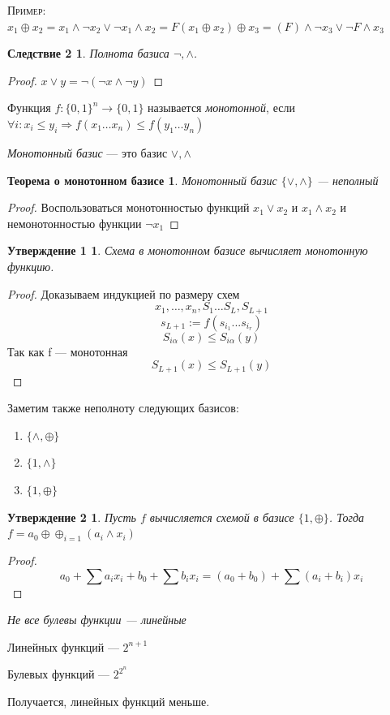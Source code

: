 \documentclass[a4paper, 12pt]{article}
\newtheorem*{sl2}{Следствие 2}
\newtheorem*{monotonousbase}{Теорема о монотонном базисе}
\newtheorem*{scheme}{Утверждение 1}
\newtheorem*{n2}{Утверждение 2}
\begin{document}
\textsc{Пример: }
$x_1 \oplus x_2 = x_1 \wedge \lnot x_2 \vee \lnot x_1 \wedge x_2 = F
(x_1 \oplus x_2) \oplus x_3 = (F)  \wedge \lnot x_3 \vee \lnot F \wedge x_3$

\begin{sl2}
Полнота базиса {$\lnot, \wedge$}.
\end{sl2}
\begin{proof}
$x \vee y = \lnot (\lnot x \wedge \lnot y)$
\end{proof}
Функция $f:\{0, 1\}^n \rightarrow \{0, 1\}$ называется \textit{монотонной}, если $\forall i: x_i \leqslant y_i \Rightarrow f(x_1 \ldots x_n) \leqslant f(y_1 \ldots y_n)$

\textit{Монотонный базис} --- это базис {$\vee, \wedge$}

\begin{monotonousbase}
Монотонный базис $\{\vee, \wedge\}$ --- неполный
\end{monotonousbase}
\begin{proof}
Воспользоваться монотонностью функций $x_1 \vee x_2$ и $x_1 \wedge x_2$ и немонотонностью функции $\lnot x_1$
\end{proof}
\begin{scheme}
Схема в монотонном базисе вычисляет монотонную функцию.
\end{scheme}
\begin{proof}
Доказываем индукцией по размеру схем
\[x_1, \ldots, x_n, S_1 \ldots S_L, S_{L+1}\] 
\[s_{L+1}:=f(s_{i_1}... s_{i_r})\]
\[S_{i\alpha}(x) \leqslant S_{i\alpha}(y)\]
Так как f --- монотонная
\[S_{L+1}(x) \leqslant S_{L+1}(y)\]
\end{proof}

Заметим также неполноту следующих базисов:
\begin{enumerate}
    \item $\{\wedge,\oplus\}$
    \item $\{1,\wedge\}$
    \item $\{1,\oplus\}$
\end{enumerate}

\begin{n2}
Пусть $f$ вычисляется схемой в базисе $\{1,\oplus\}$. Тогда $f = a_0 \oplus \oplus_{i=1}(a_i \wedge x_i)$
\end{n2}
\begin{proof}
\[a_0 + \sum a_ix_i + b_0 + \sum b_ix_i = (a_0 + b_0) + \sum (a_i + b_i)x_i\]
\end{proof}

\textit{Не все булевы функции --- линейные}

Линейных функций --- $2^{n+1}$

Булевых функций --- $2^{2^n}$

Получается, линейных функций меньше.
\end{document}

